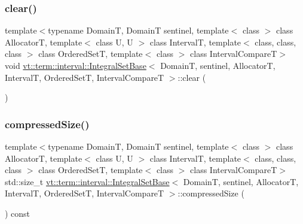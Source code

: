 \mbox{\label{structvt_1_1term_1_1interval_1_1_integral_set_base_a5786bb488ef808cd89474afa94ecc856}} 
\subsubsection{\texorpdfstring{clear()}{clear()}}
{\footnotesize\ttfamily template$<$typename DomainT, DomainT sentinel, template$<$ class $>$ class AllocatorT, template$<$ class U, U $>$ class IntervalT, template$<$ class, class, class $>$ class Ordered\+SetT, template$<$ class $>$ class Interval\+CompareT$>$ \\
void \hyperlink{structvt_1_1term_1_1interval_1_1_integral_set_base}{vt\+::term\+::interval\+::\+Integral\+Set\+Base}$<$ DomainT, sentinel, AllocatorT, IntervalT, Ordered\+SetT, Interval\+CompareT $>$\+::clear (\begin{DoxyParamCaption}{ }\end{DoxyParamCaption})\hspace{0.3cm}{\ttfamily [inline]}}

\mbox{\label{structvt_1_1term_1_1interval_1_1_integral_set_base_a48ab16ffe03b4285c7210df3084904af}} 
\subsubsection{\texorpdfstring{compressed\+Size()}{compressedSize()}}
{\footnotesize\ttfamily template$<$typename DomainT, DomainT sentinel, template$<$ class $>$ class AllocatorT, template$<$ class U, U $>$ class IntervalT, template$<$ class, class, class $>$ class Ordered\+SetT, template$<$ class $>$ class Interval\+CompareT$>$ \\
std\+::size\+\_\+t \hyperlink{structvt_1_1term_1_1interval_1_1_integral_set_base}{vt\+::term\+::interval\+::\+Integral\+Set\+Base}$<$ DomainT, sentinel, AllocatorT, IntervalT, Ordered\+SetT, Interval\+CompareT $>$\+::compressed\+Size (\begin{DoxyParamCaption}{ }\end{DoxyParamCaption}) const\hspace{0.3cm}{\ttfamily [inline]}}

